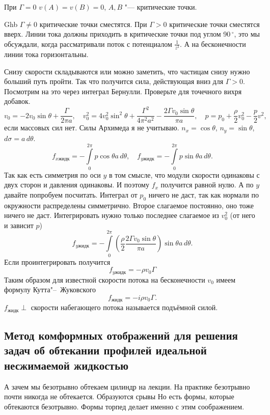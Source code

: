 При $\Gamma=0$ $v(A)=v(B)=0$, $A,B$ "--- критические точки.

Ghb $\Gamma\ne0$ критические точки сместятся. При $\Gamma>0$ критические точки сместятся вверх. Линии тока должны приходить в критические точки под углом 90\,${}^\circ$, это мы обсуждали, когда рассматривали поток с потенциалом $\frac1{z^2}$. А на бесконечности линии тока горизонтальны.

Снизу скорости складываются или можно заметить, что частицам снизу нужно больший путь пройти. Так что получится сила, действующая вниз для $\Gamma>0$.
Посмотрим на это через интеграл Бернулли. Проверьте для точечного вихря добавок.
\[
	v_0 = -2v_0\sin\theta + \frac\Gamma{2\pi a},\quad
	v_0^2 = 4v_0^2\sin^2\theta + \frac{\Gamma^2}{4\pi^2a^2}-\frac{2\Gamma v_0\sin\theta}{\pi a},\quad
	p = p_0+\frac\rho2v_0^2-\frac p2v^2,
\]
если массовых сил нет. Силы Архимеда я не учитываю. $n_x = \cos\theta$, $n_y = \sin\theta$, $d\sigma = a\,d\theta$.
\[
	f_{x\text{жидк}} = -\int\limits_0^{2\pi}p\cos\theta a\,d\theta, \quad
	f_{y\text{жидк}} = -\int\limits_0^{2\pi}p\sin\theta a\,d\theta.
\]
Так как есть симметрия по оси $y$ в том смысле, что модули скорости одинаковы с двух сторон и давления одинаковы. И поэтому $f_x$ получится равной нулю. А по $y$ давайте попробуем посчитать. Интеграл от $p_0$ ничего не даст, так как нормали по окружности распределены симметрично. Второе слагаемое постоянно, оно тоже ничего не даст. Интегрировать нужно только последнее слагаемое из $v_0^2$ (от него и зависит $p$)
\[
	f_{y\text{жидк}} = -\int\limits_0^{2\pi}\left(\frac\rho2\frac{2\Gamma v_0\sin\theta}{\pi a}\right)\sin\theta a\,d\theta.
\]
Если проинтегрировать получится
\[
f_{y\text{жидк}} = -\rho v_0\Gamma
\]
Таким образом для известной скорости потока на бесконечности $v_0$ имеем формулу Кутта"--~Жуковского
\begin{equation}
	f_{\text{жидк}} = -i\rho v_0\Gamma.
	\label{<++>}
\end{equation}
$f_{\text{жидк}}\perp$ скорости набегающего потока называется подъёмной силой.


\subsection{Метод комформных отображений для решения задач об обтекании профилей идеальной несжимаемой жидкостью}
А зачем мы безотрывно обтекаем цилиндр на лекции. На практике безотрывно почти никогда не обтекается. Образуются срывы
Но есть формы, которые обтекаются безотрывно. Формы торпед делает именно с этим соображением.

